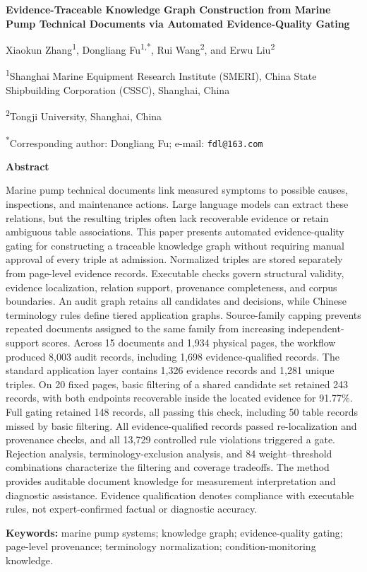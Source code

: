 \documentclass[a4paper,11pt]{article}
\begin{document}
\begin{center}
{\large\bfseries Evidence-Traceable Knowledge Graph Construction from Marine Pump Technical Documents via Automated Evidence-Quality Gating\par}
\medskip
Xiaokun Zhang\textsuperscript{1}, Dongliang Fu\textsuperscript{1,*}, Rui Wang\textsuperscript{2}, and Erwu Liu\textsuperscript{2}\par
\small
\textsuperscript{1}Shanghai Marine Equipment Research Institute (SMERI), China State Shipbuilding Corporation (CSSC), Shanghai, China\par
\textsuperscript{2}Tongji University, Shanghai, China\par
\textsuperscript{*}Corresponding author: Dongliang Fu; e-mail: \texttt{fdl@163.com}
\end{center}
\medskip
\textbf{Abstract}

Marine pump technical documents link measured symptoms to possible causes, inspections, and maintenance actions. Large language models can extract these relations, but the resulting triples often lack recoverable evidence or retain ambiguous table associations. This paper presents automated evidence-quality gating for constructing a traceable knowledge graph without requiring manual approval of every triple at admission. Normalized triples are stored separately from page-level evidence records. Executable checks govern structural validity, evidence localization, relation support, provenance completeness, and corpus boundaries. An audit graph retains all candidates and decisions, while Chinese terminology rules define tiered application graphs. Source-family capping prevents repeated documents assigned to the same family from increasing independent-support scores. Across 15 documents and 1,934 physical pages, the workflow produced 8,003 audit records, including 1,698 evidence-qualified records. The standard application layer contains 1,326 evidence records and 1,281 unique triples. On 20 fixed pages, basic filtering of a shared candidate set retained 243 records, with both endpoints recoverable inside the located evidence for 91.77\%. Full gating retained 148 records, all passing this check, including 50 table records missed by basic filtering. All evidence-qualified records passed re-localization and provenance checks, and all 13,729 controlled rule violations triggered a gate. Rejection analysis, terminology-exclusion analysis, and 84 weight--threshold combinations characterize the filtering and coverage tradeoffs. The method provides auditable document knowledge for measurement interpretation and diagnostic assistance. Evidence qualification denotes compliance with executable rules, not expert-confirmed factual or diagnostic accuracy.

\textbf{Keywords:} marine pump systems; knowledge graph; evidence-quality gating; page-level provenance; terminology normalization; condition-monitoring knowledge.
\end{document}
